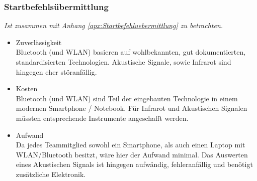 		\subsubsection{Startbefehlsübermittlung}
			\textit{Ist zusammen mit Anhang \ref{apx:Startbefehluebermittlung} zu betrachten.}
			\begin{itemize}
				\item Zuverlässigkeit\\
				Bluetooth (und WLAN) basieren auf wohlbekannten, gut dokumentierten, standardisierten Technologien. Akustische Signale, sowie Infrarot sind hingegen eher störanfällig.
				\item Kosten\\
				Bluetooth (und WLAN) sind Teil der eingebauten Technologie in einem modernen Smartphone / Notebook. Für Infrarot und Akustischen Signalen müssten entsprechende Instrumente angeschafft werden.
				\item Aufwand\\
				Da jedes Teammitglied sowohl ein Smartphone, als auch einen Laptop mit WLAN/Bluetooth besitzt, wäre hier der Aufwand minimal. Das Auswerten eines Akustischen Signals ist hingegen aufwändig, fehleranfällig und benötigt zusätzliche Elektronik.
			\end{itemize}	
			
